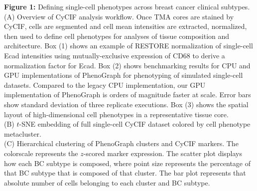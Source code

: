 \documentclass[preprint,review,3p,12pt]{elsarticle}
\begin{document}
\noindent
\textbf{Figure 1:}  Defining single-cell phenotypes across breast cancer clinical subtypes.\\
(A) Overview of CyCIF analysis workflow. Once TMA cores are stained by CyCIF, cells are segmented and cell mean intensities are extracted, normalized, then used to define cell phenotypes for analyses of tissue composition and architecture. Box (1) shows an example of RESTORE normalization of single-cell Ecad intensities using mutually-exclusive expression of CD68 to derive a normalization factor for Ecad. Box (2) shows benchmarking results for CPU and GPU implementations of PhenoGraph for phenotyping of simulated single-cell datasets. Compared to the legacy CPU implementation, our GPU implementation of PhenoGraph is orders of magnitude faster at scale. Error bars show standard deviation of three replicate executions. Box (3) shows the spatial layout of high-dimensional cell phenotypes in a representative tissue core.\\
(B) $t$-SNE embedding of full single-cell CyCIF dataset colored by cell phenotype metacluster. \\
(C) Hierarchical clustering of PhenoGraph clusters and CyCIF markers. The colorscale represents the $z$-scored marker expression. The scatter plot displays how each BC subtype is composed, where point size represents the percentage of that BC subtype that is composed of that cluster. The bar plot represents that absolute number of cells belonging to each cluster and BC subtype.
\end{document}
